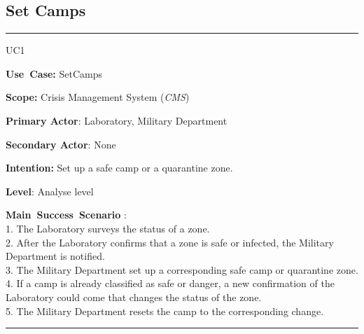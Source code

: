 \subsection{Set Camps}
\vspace{0.5cm}
\hrule
\vspace{0.5cm}
\begin{lyxlist}{UC1}
\small{
\item [\textbf{Use~Case:}] SetCamps
\item [\textbf{Scope:}] Crisis Management System (\emph{CMS})
\item [\textbf{Primary Actor}:] Laboratory, Military Department
\item [\textbf{Secondary Actor}:] None
\item [\textbf{Intention:}] Set up a safe camp or a quarantine zone.
\item [\textbf{Level}:]Analyse level
\item [\textbf{Main~Success~Scenario}]:\\
1. The Laboratory surveys the status of a zone.\\
2. After the Laboratory confirms that a zone is safe or infected, the
Military Department is notified.\\
3. The Military Department set up a corresponding safe camp or quarantine
zone.\\ 
4.	If a camp is already classified as safe or danger, a new confirmation of the
Laboratory could come that changes the status of the zone.\\
5. The Military Department resets the camp to the corresponding change.\\
}
\end{lyxlist}
\hrule
\vspace{0.5cm} 

